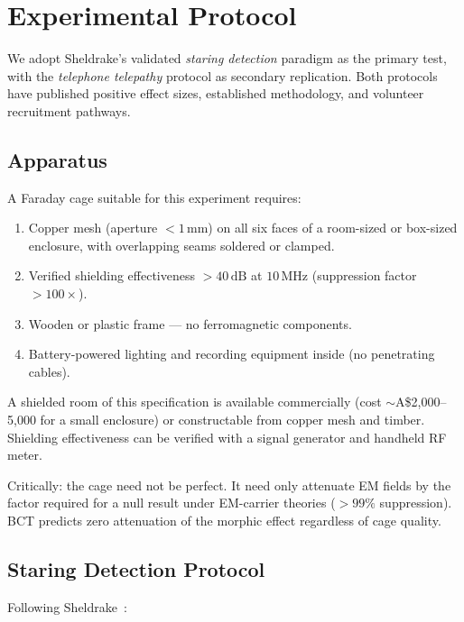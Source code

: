 \documentclass[aps,prl,twocolumn,superscriptaddress,floatfix]{revtex4-2}
\begin{document}
\section{Experimental Protocol}

We adopt Sheldrake's validated \emph{staring detection} paradigm
\cite{Sheldrake2000} as the primary test, with the \emph{telephone
telepathy} protocol \cite{Sheldrake2003} as secondary replication.
Both protocols have published positive effect sizes, established
methodology, and volunteer recruitment pathways.

\subsection{Apparatus}

A Faraday cage suitable for this experiment requires:
\begin{enumerate}
\item Copper mesh (aperture $< 1\,\mathrm{mm}$) on all six faces of
    a room-sized or box-sized enclosure, with overlapping seams
    soldered or clamped.
\item Verified shielding effectiveness $> 40\,\mathrm{dB}$ at
    $10\,\mathrm{MHz}$ (suppression factor $> 100\times$).
\item Wooden or plastic frame --- no ferromagnetic components.
\item Battery-powered lighting and recording equipment inside
    (no penetrating cables).
\end{enumerate}

A shielded room of this specification is available commercially
(cost $\sim$A\$2,000--5,000 for a small enclosure) or constructable
from copper mesh and timber. Shielding effectiveness can be verified
with a signal generator and handheld RF meter.

Critically: the cage need not be perfect. It need only attenuate EM
fields by the factor required for a null result under EM-carrier
theories ($> 99\%$ suppression). BCT predicts zero attenuation of
the morphic effect regardless of cage quality.

\subsection{Staring Detection Protocol}

Following Sheldrake~\cite{Sheldrake2000}:
\end{document}
